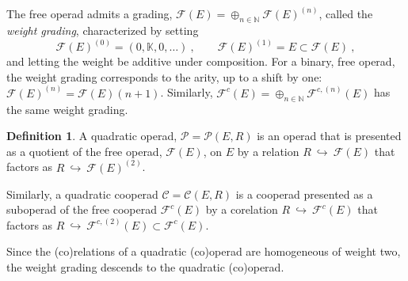 \documentclass[11pt]{amsart}
\numberwithin{equation}{section}
\newtheorem{prop}[theo]{Proposition}
\theoremstyle{definition}
\newtheorem{defn}[theo]{Definition}
\newcommand{\bb}{\mathbb}
\newcommand{\mc}{\mathcal}
\newcommand{\K}{{\bb K}}
\newcommand{\ik}{{\bb K}}
\newcommand{\End}{{\textup{End}}}
\newcommand{\into}{{\ \hookrightarrow\ }}
\newcommand{\Alg}{{\textup{Alg}}}
\newcommand{\CC}{{\textup{CC}}}
\newcommand{\0}{{\textbf{0}}}
\newcommand{\Z}{\bb Z}
\newcommand{\DGVect}{\textup{DGVect}}
\def\IN{\mathbb{N}}
\def\CC{{\mc C}}
\def\FF{{\mc F}}
\def\PP{{\mc P}}
\begin{document}




%
%

The free operad admits a grading, $\FF(E) = \oplus_{n\in \IN} \FF(E)^{(n)}$, called the \emph{weight grading}, characterized by setting
\[
\FF(E)^{(0)} = (0, \ik,0,\dots)~, \qquad \FF(E)^{(1)} = E\subset \FF(E)~,
\]
and letting the weight be additive under composition. For a binary, free operad, the weight grading corresponds to the arity, up to a shift by one: $\FF(E)^{(n)}=\FF(E)(n+1)$. Similarly, $\FF^c(E)=\oplus_{n\in\IN} \FF^{c,(n)}(E)$ has the same weight grading.

\begin{defn}\label{quadopdefn} 
A quadratic operad, $\PP=\PP(E,R)$ is an operad that is presented as a quotient of the free operad, $\FF(E)$, on $E$ by a relation $R\into \FF(E)$ that factors as $R\into \FF(E)^{(2)}$.

Similarly, a quadratic cooperad $\CC = \CC(E,R)$ is a cooperad presented as a suboperad of the free cooperad $\FF^c (E)$ by a corelation $R\into \FF^c(E)$ that factors as $R\into\FF^{c,(2)}(E)\subset \FF^c(E)$.
\end{defn}
Since the (co)relations of a quadratic (co)operad are homogeneous of weight two, the weight grading descends to the quadratic (co)operad.
\end{document}

